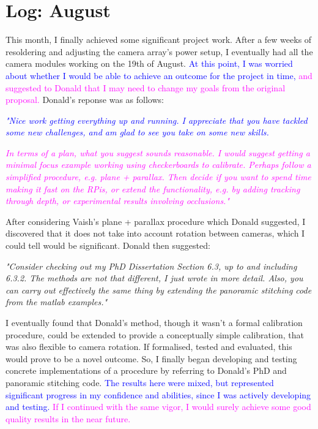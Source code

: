 \documentclass[a4paper, 12pt]{article}
\begin{document}
\section{Log: August}
This month, I finally achieved some significant project work. After a few weeks of resoldering and adjusting the camera array's power setup, I eventually had all the camera modules working on the 19th of August. \textcolor{Blue}{At this point, I was worried about whether I would be able to achieve an outcome for the project in time,} \textcolor{Magenta}{and suggested to Donald that I may need to change my goals from the original proposal.} Donald's reponse was as follows:

\emph{\textcolor{Blue}{"Nice work getting everything up and running. I appreciate that you have tackled some new challenges, and am glad to see you take on some new skills.}}

\emph{\textcolor{Magenta}{In terms of a plan, what you suggest sounds reasonable.  I would suggest getting a minimal focus example working using checkerboards to calibrate. Perhaps follow a simplified procedure, e.g. plane + parallax. Then decide if you want to spend time making it fast on the RPis, or extend the functionality, e.g. by adding tracking through depth, or experimental results involving occlusions."}}

After considering Vaish's plane + parallax procedure which Donald suggested, I discovered that it does not take into account rotation between cameras, which I could tell would be significant. Donald then suggested:

\emph{"Consider checking out my PhD Dissertation Section 6.3, up to and including 6.3.2. The methods are not that different, I just wrote in more detail. Also, you can carry out effectively the same thing by extending the panoramic stitching code from the matlab examples."}

I eventually found that Donald's method, though it wasn't a formal calibration procedure, could be extended to provide a conceptually simple calibration, that was also flexible to camera rotation. If formalised, tested and evaluated, this would prove to be a novel outcome. So, I finally began developing and testing concrete implementations of a procedure by referring to Donald's PhD and panoramic stitching code. \textcolor{Blue}{The results here were mixed, but represented significant progress in my confidence and abilities, since I was actively developing and testing.} \textcolor{Magenta}{If I continued with the same vigor, I would surely achieve some good quality results in the near future.}
\end{document}
